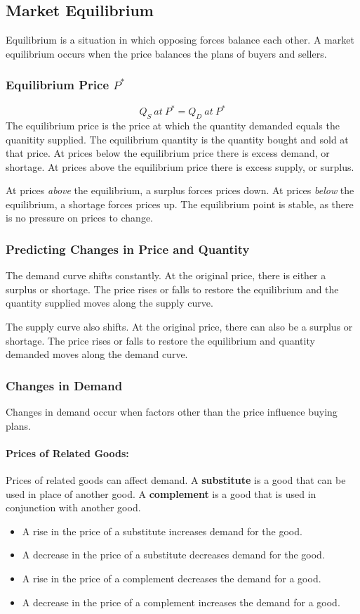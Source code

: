 \documentclass[letterpaper, 12pt]{article}
\begin{document}
\subsection{Market Equilibrium}
Equilibrium is a situation in which opposing forces balance each other. A
market equilibrium occurs when the price balances the plans of buyers and
sellers.

\subsubsection{Equilibrium Price \( P^{*} \)}
\[ Q_{S}\ at\ P^{*} = Q_{D}\ at\ P^{*} \]
The equilibrium price is the price at which the quantity demanded equals the
quanitity supplied. The equilibrium quantity is the quantity bought and sold
at that price. At prices below the equilibrium price there is excess demand,
or shortage. At prices above the equilibrium price there is excess supply,
or surplus. \par
At prices \textit{above} the equilibrium, a surplus forces prices down. At
prices \textit{below} the equilibrium, a shortage forces prices up. The
equilibrium point is stable, as there is no pressure on prices to change.

\subsubsection{Predicting Changes in Price and Quantity}
The demand curve shifts constantly. At the original price, there is either
a surplus or shortage. The price rises or falls to restore the equilibrium
and the quantity supplied moves along the supply curve. \par
The supply curve also shifts. At the original price, there can also be a
surplus or shortage. The price rises or falls to restore the equilibrium and
quantity demanded moves along the demand curve.

\subsubsection{Changes in Demand}
Changes in demand occur when factors other than the price influence buying
plans.

\paragraph{Prices of Related Goods:}
Prices of related goods can affect demand. A \textbf{substitute} is a good
that can be used in place of another good. A \textbf{complement} is a good
that is used in conjunction with another good.
\begin{itemize}
  \item A rise in the price of a substitute increases demand for the good.
  \item A decrease in the price of a substitute decreases demand for the good.
  \item A rise in the price of a complement decreases the demand for a good.
  \item A decrease in the price of a complement increases the demand for a good.
\end{itemize}
\end{document}
